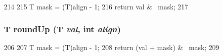 \begin{DoxyCode}
214 {
215     T mask = (T)align - 1;
216     return val & ~mask;
217 }
\end{DoxyCode}
\hypertarget{intmath_8hh_a4d254a89b294890f6ce3a474f4e8c6c7}{
\subsubsection[{roundUp}]{\setlength{\rightskip}{0pt plus 5cm}T roundUp (T {\em val}, \/  int {\em align})}}
\label{intmath_8hh_a4d254a89b294890f6ce3a474f4e8c6c7}



\begin{DoxyCode}
206 {
207     T mask = (T)align - 1;
208     return (val + mask) & ~mask;
209 }
\end{DoxyCode}
